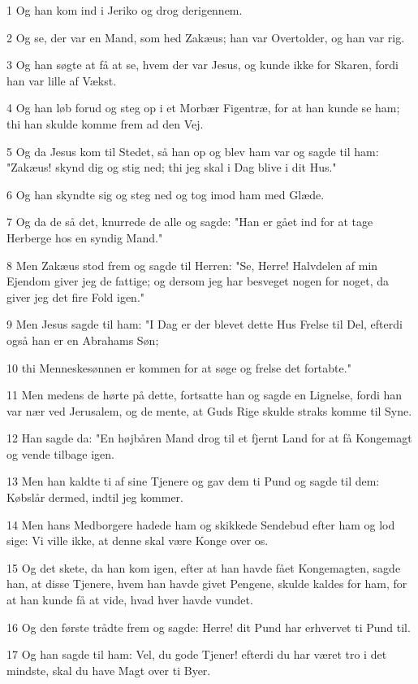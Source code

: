 \par 1 Og han kom ind i Jeriko og drog derigennem.
\par 2 Og se, der var en Mand, som hed Zakæus; han var Overtolder, og han var rig.
\par 3 Og han søgte at få at se, hvem der var Jesus, og kunde ikke for Skaren, fordi han var lille af Vækst.
\par 4 Og han løb forud og steg op i et Morbær Figentræ, for at han kunde se ham; thi han skulde komme frem ad den Vej.
\par 5 Og da Jesus kom til Stedet, så han op og blev ham var og sagde til ham: "Zakæus! skynd dig og stig ned; thi jeg skal i Dag blive i dit Hus."
\par 6 Og han skyndte sig og steg ned og tog imod ham med Glæde.
\par 7 Og da de så det, knurrede de alle og sagde: "Han er gået ind for at tage Herberge hos en syndig Mand."
\par 8 Men Zakæus stod frem og sagde til Herren: "Se, Herre! Halvdelen af min Ejendom giver jeg de fattige; og dersom jeg har besveget nogen for noget, da giver jeg det fire Fold igen."
\par 9 Men Jesus sagde til ham: "I Dag er der blevet dette Hus Frelse til Del, efterdi også han er en Abrahams Søn;
\par 10 thi Menneskesønnen er kommen for at søge og frelse det fortabte."
\par 11 Men medens de hørte på dette, fortsatte han og sagde en Lignelse, fordi han var nær ved Jerusalem, og de mente, at Guds Rige skulde straks komme til Syne.
\par 12 Han sagde da: "En højbåren Mand drog til et fjernt Land for at få Kongemagt og vende tilbage igen.
\par 13 Men han kaldte ti af sine Tjenere og gav dem ti Pund og sagde til dem: Købslår dermed, indtil jeg kommer.
\par 14 Men hans Medborgere hadede ham og skikkede Sendebud efter ham og lod sige: Vi ville ikke, at denne skal være Konge over os.
\par 15 Og det skete, da han kom igen, efter at han havde fået Kongemagten, sagde han, at disse Tjenere, hvem han havde givet Pengene, skulde kaldes for ham, for at han kunde få at vide, hvad hver havde vundet.
\par 16 Og den første trådte frem og sagde: Herre! dit Pund har erhvervet ti Pund til.
\par 17 Og han sagde til ham: Vel, du gode Tjener! efterdi du har været tro i det mindste, skal du have Magt over ti Byer.
